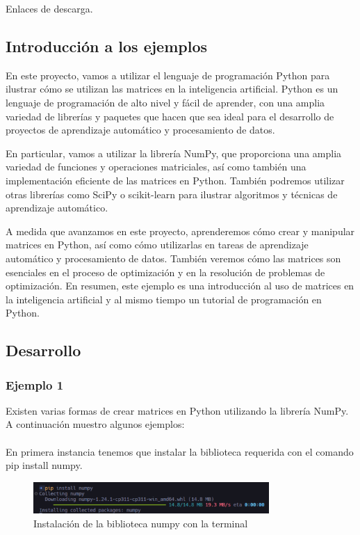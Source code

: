 \documentclass{article}
\theoremstyle{mytheoremstyle}
\theoremstyle{mytheoremstyle}
\theoremstyle{myproblemstyle}
\begin{document}
Enlaces de descarga.

\subsection{Introducción a los ejemplos}

En este proyecto, vamos a utilizar el lenguaje de programación Python para ilustrar cómo se utilizan las matrices en la inteligencia artificial. Python es un lenguaje de programación de alto nivel y fácil de aprender, con una amplia variedad de librerías y paquetes que hacen que sea ideal para el desarrollo de proyectos de aprendizaje automático y procesamiento de datos.

En particular, vamos a utilizar la librería NumPy, que proporciona una amplia variedad de funciones y operaciones matriciales, así como también una implementación eficiente de las matrices en Python. También podremos utilizar otras librerías como SciPy o scikit-learn para ilustrar algoritmos y técnicas de aprendizaje automático.

A medida que avanzamos en este proyecto, aprenderemos cómo crear y manipular matrices en Python, así como cómo utilizarlas en tareas de aprendizaje automático y procesamiento de datos. También veremos cómo las matrices son esenciales en el proceso de optimización y en la resolución de problemas de optimización. En resumen, este ejemplo es una introducción al uso de matrices en la inteligencia artificial y al mismo tiempo un tutorial de programación en Python.

\subsection{Desarrollo}

\subsubsection{Ejemplo 1}

Existen varias formas de crear matrices en Python utilizando la librería NumPy. A continuación muestro algunos ejemplos:
\\
\\
En primera instancia tenemos que instalar la biblioteca requerida con el comando pip install numpy.

\begin{figure}[ht]
    \centering
    \includegraphics[width=0.8\textwidth]{terminal1.png}
    \caption{Instalación de la biblioteca numpy con la terminal}
    \label{fig:1}
\end{figure}
\end{document}
